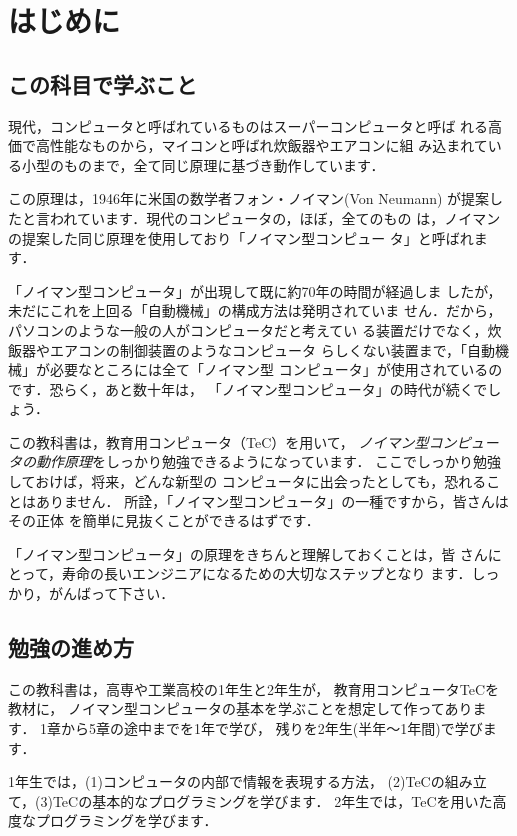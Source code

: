 \chapter{はじめに}

\section{この科目で学ぶこと}
現代，コンピュータと呼ばれているものはスーパーコンピュータと呼ば
れる高価で高性能なものから，マイコンと呼ばれ炊飯器やエアコンに組
み込まれている小型のものまで，全て同じ原理に基づき動作しています．

この原理は，1946年に米国の数学者フォン・ノイマン(Von Neumann)
が提案したと言われています．現代のコンピュータの，ほぼ，全てのもの
は，ノイマンの提案した同じ原理を使用しており「ノイマン型コンピュー
タ」と呼ばれます．

「ノイマン型コンピュータ」が出現して既に約70年の時間が経過しま
したが，未だにこれを上回る「自動機械」の構成方法は発明されていま
せん．だから，パソコンのような一般の人がコンピュータだと考えてい
る装置だけでなく，炊飯器やエアコンの制御装置のようなコンピュータ
らしくない装置まで，「自動機械」が必要なところには全て「ノイマン型
コンピュータ」が使用されているのです．恐らく，あと数十年は，
「ノイマン型コンピュータ」の時代が続くでしょう．

この教科書は，教育用コンピュータ（TeC）を用いて，
\emph{ノイマン型コンピュータの動作原理}をしっかり勉強できるようになっています．
ここでしっかり勉強しておけば，将来，どんな新型の
コンピュータに出会ったとしても，恐れることはありません．
所詮，「ノイマン型コンピュータ」の一種ですから，皆さんはその正体
を簡単に見抜くことができるはずです．

「ノイマン型コンピュータ」の原理をきちんと理解しておくことは，皆
さんにとって，寿命の長いエンジニアになるための大切なステップとなり
ます．しっかり，がんばって下さい．

\section{勉強の進め方}

この教科書は，高専や工業高校の1年生と2年生が，
教育用コンピュータTeCを教材に，
ノイマン型コンピュータの基本を学ぶことを想定して作ってあります．
1章から5章の途中までを1年で学び，
残りを2年生(半年〜1年間)で学びます．

1年生では，(1)コンピュータの内部で情報を表現する方法，
(2)TeCの組み立て，(3)TeCの基本的なプログラミングを学びます．
2年生では，TeCを用いた高度なプログラミングを学びます．

